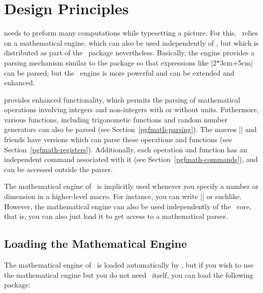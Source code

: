 %
%
%



\section{Design Principles}

\pgfname{} needs to preform many computations while typesetting a
picture. For this, \pgfname\ relies on a mathematical engine, which
can also be used independently of \pgfname, but which is distributed
as part of the \pgfname\ package nevertheless. Basically, the engine
provides a parsing mechanism similar to the \calcname{} package so
that expressions like |2*3cm+5cm| can be parsed; but the \pgfname\
engine is more powerful and can be extended and enhanced. 

\pgfname{} provides enhanced functionality, which permits the parsing
of mathematical operations involving integers and non-integers 
with or without units. Futhermore, various functions, including
trigonometic functions and random number generators can also be 
parsed (see Section~\ref{pgfmath-parsing}). 
The \calcname{} macros |\setlength| and friends have \pgfname{} versions 
which can parse these operations and functions 
(see Section~\ref{pgfmath-registers}). Additionally, each operation
and function has an independent \pgfname{} command associated with it
(see Section~\ref{pgfmath-commands}), and can be 
accessed outside the parser.

The mathematical engine of \pgfname\ is implicitly used whenever you
specify a number or dimension in a higher-level macro. For instance,
you can write |\pgfpoint{2cm+4cm/2}{3cm*sin(30)}| or
suchlike. However, the mathematical engine can also be used
independently of the \pgfname\ core, that is, you can also just load
it to get access to a mathematical parser.


\subsection{Loading the Mathematical Engine}

The mathematical engine of \pgfname\ is loaded automatically by
\pgfname, but if you wish to use the mathematical engine but you do
not need \pgfname\ itself, you can load the following package:

